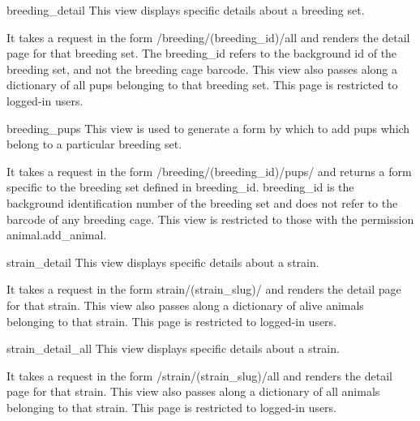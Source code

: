 \documentclass[letterpaper,10pt,english]{sphinxmanual}
\begin{document}
\hypertarget{animal.views.breeding_detail}{}\begin{memberdesc}{breeding\_detail}
This view displays specific details about a breeding set.

It takes a request in the form /breeding/(breeding\_id)/all and renders the detail page for that breeding set.
The breeding\_id refers to the background id of the breeding set, and not the breeding cage barcode.
This view also passes along a dictionary of all pups belonging to that breeding set.
This page is restricted to logged-in users.
\end{memberdesc}

\hypertarget{animal.views.breeding_pups}{}\begin{memberdesc}{breeding\_pups}
This view is used to generate a form by which to add pups which belong to a particular breeding set.

It takes a request in the form /breeding/(breeding\_id)/pups/ and returns a form specific to the breeding set defined in breeding\_id.  breeding\_id is the background identification number of the breeding set and does not refer to the barcode of any breeding cage.
This view is restricted to those with the permission animal.add\_animal.
\end{memberdesc}

\hypertarget{animal.views.strain_detail}{}\begin{memberdesc}{strain\_detail}
This view displays specific details about a strain.

It takes a request in the form strain/(strain\_slug)/ and renders the detail page for that strain.
This view also passes along a dictionary of alive animals belonging to that strain.
This page is restricted to logged-in users.
\end{memberdesc}

\hypertarget{animal.views.strain_detail_all}{}\begin{memberdesc}{strain\_detail\_all}
This view displays specific details about a strain.

It takes a request in the form /strain/(strain\_slug)/all and renders the detail page for that strain.
This view also passes along a dictionary of all animals belonging to that strain.
This page is restricted to logged-in users.
\end{memberdesc}
\end{document}
